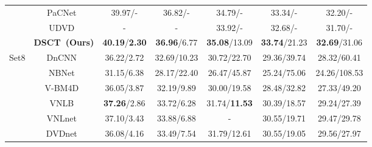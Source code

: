 \documentclass[journal]{IEEEtran}
\begin{document}
\begin{center}
\begin{table*}[ht]
{\begin{tabular}{|c|c|cl|cl|cl|cl|cl|}
                          & PaCNet~\cite{Vaksman_2021_ICCV}                 & \multicolumn{2}{c|}{39.97/\;\;- }     & \multicolumn{2}{c|}{36.82/\;\;- }     & \multicolumn{2}{c|}{34.79/\;\;- }     & \multicolumn{2}{c|}{33.34/\;\;- }     & \multicolumn{2}{c|}{32.20/\;\;- }      \\
                          & UDVD~\cite{Sheth_2021_ICCV}                   & \multicolumn{2}{c|}{-}           & \multicolumn{2}{c|}{ - }           & \multicolumn{2}{c|}{33.92/\;\;- }     & \multicolumn{2}{c|}{32.68/\;\;- }     & \multicolumn{2}{c|}{31.70/\;\;- }      \\
                           \cline{2-12} 
                          & \textbf{DSCT~(Ours)}                   & \multicolumn{2}{c|}{\textbf{40.19}/\textbf{2.30}}  & \multicolumn{2}{c|}{\textbf{36.96}/6.77}  & \multicolumn{2}{c|}{\textbf{35.08}/13.09} & \multicolumn{2}{c|}{\textbf{33.74}/21.23} & \multicolumn{2}{c|}{\textbf{32.69}/31.06}  \\ \hline
\multirow{10}{*}{Set8}     & DnCNN~\cite{Zhang2017BeyondAG}                  & \multicolumn{2}{c|}{36.22/2.72}  & \multicolumn{2}{c|}{32.69/10.23} & \multicolumn{2}{c|}{30.72/22.70} & \multicolumn{2}{c|}{29.36/39.74} & \multicolumn{2}{c|}{28.32/60.41}  \\
                          & NBNet~\cite{Cheng2020NBNetNB}                  & \multicolumn{2}{c|}{31.15/6.38}  & \multicolumn{2}{c|}{28.17/22.40} & \multicolumn{2}{c|}{26.47/45.87} & \multicolumn{2}{c|}{25.24/75.06} & \multicolumn{2}{c|}{24.26/108.53} \\
                          & V-BM4D~\cite{Maggioni2012VideoDD}                 & \multicolumn{2}{c|}{36.05/3.87}  & \multicolumn{2}{c|}{32.19/9.89}  & \multicolumn{2}{c|}{30.00/19.58} & \multicolumn{2}{c|}{28.48/32.82} & \multicolumn{2}{c|}{27.33/49.20}  \\
                          & VNLB~\cite{Arias2017VideoDV}                  & \multicolumn{2}{c|}{\textbf{37.26}/2.86}  & \multicolumn{2}{c|}{33.72/6.28}  & \multicolumn{2}{c|}{31.74/\textbf{11.53}} &\multicolumn{2}{c|}{30.39/18.57} & \multicolumn{2}{c|}{29.24/27.39}  \\
                          & VNLnet~\cite{Davy2018NonLocalVD}                 & \multicolumn{2}{c|}{37.10/3.43}  & \multicolumn{2}{c|}{33.88/6.88}  & \multicolumn{2}{c|}{ - }           & \multicolumn{2}{c|}{30.55/19.71} & \multicolumn{2}{c|}{29.47/29.78}  \\
                          & DVDnet~\cite{Tassano2019DVDNETAF}                & \multicolumn{2}{c|}{36.08/4.16}  & \multicolumn{2}{c|}{33.49/7.54}  & \multicolumn{2}{c|}{31.79/12.61} & \multicolumn{2}{c|}{30.55/19.05} & \multicolumn{2}{c|}{29.56/27.97}  \\

\end{tabular}}
\end{table*}
\end{center}
\end{document}
